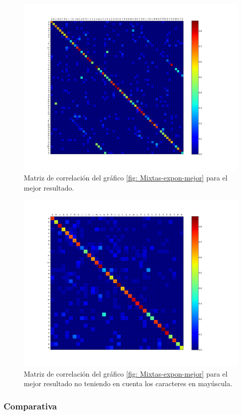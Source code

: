 			\begin{figure}[!htbp]
				\centerline{\includegraphics[scale=0.4]{img/resultados/mixtas/best_expon_matrix_Alpha0,1_4080-4.png}}
				\caption[Mixtas Matriz expon]{Matriz de correlación del gráfico \ref{fig: Mixtas-expon-mejor} para el mejor resultado. }
				\label{fig: Mixtas-Matrix-expon-mejor}
			\end{figure}
	
			\begin{figure}[htbp]
				\centerline{\includegraphics[scale=0.4]{img/resultados/mixtas/best_expon_matrix_Alpha0,1_4080-4_ins.png}}
				\caption[Matriz de correlación ``case insensitive'' para mixtas expon]{Matriz de correlación del gráfico \ref{fig: Mixtas-expon-mejor} para el mejor resultado no teniendo en cuenta los caracteres en mayúscula.}
				\label{fig: MatrizIns-Mixtas-expon}
			\end{figure}
	
    	\subsubsection{Comparativa}

    	